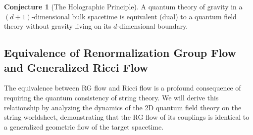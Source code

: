 \documentclass[11pt, letterpaper]{report}
\theoremstyle{plain} %
\theoremstyle{definition} %
\newtheorem{conjecture}{Conjecture}[chapter] %
\theoremstyle{remark} %
\begin{document}
\begin{conjecture}[The Holographic Principle]
\label{conj:holography_final}
A quantum theory of gravity in a $(d+1)$-dimensional bulk spacetime is equivalent (dual) to a quantum field theory without gravity living on its $d$-dimensional boundary.
\end{conjecture}

\subsection{Equivalence of Renormalization Group Flow and Generalized Ricci Flow}
\label{subsec:rg_ricci}
The equivalence between RG flow and Ricci flow is a profound consequence of requiring the quantum consistency of string theory. We will derive this relationship by analyzing the dynamics of the 2D quantum field theory on the string worldsheet, demonstrating that the RG flow of its couplings is identical to a generalized geometric flow of the target spacetime.
\end{document}
